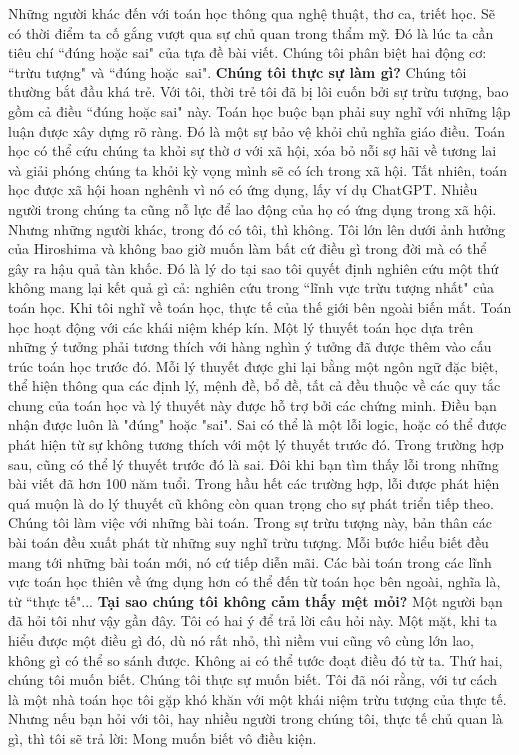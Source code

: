 \begin{multicols}{2}
	\vskip 0.1cm
	Những người khác đến với toán học thông qua nghệ thuật, thơ ca, triết học. Sẽ có thời điểm ta cố gắng vượt qua sự chủ quan trong thẩm mỹ. Đó là lúc ta cần tiêu chí ``đúng hoặc sai" của tựa đề bài viết. Chúng tôi phân biệt hai động cơ: ``trừu tượng" và ``đúng hoặc~sai".
	\vskip 0.1cm
	\textbf{\color{quantoan}Chúng tôi thực sự làm gì?}
	\vskip 0.1cm
	Chúng tôi thường bắt đầu khá trẻ. Với tôi, thời trẻ tôi đã bị lôi cuốn bởi sự trừu tượng, bao gồm cả điều ``đúng hoặc sai" này. Toán học buộc bạn phải suy nghĩ với những lập luận được xây dựng rõ ràng. Đó là một sự bảo vệ khỏi chủ nghĩa giáo điều. Toán học có thể cứu chúng ta khỏi sự thờ ơ với xã hội, xóa bỏ nỗi sợ hãi về tương lai và giải phóng chúng ta khỏi kỳ vọng mình sẽ có ích trong xã hội. Tất nhiên, toán học được xã hội hoan nghênh vì nó có ứng dụng, lấy ví dụ ChatGPT. 
	\vskip 0.1cm
	Nhiều người trong chúng ta cũng nỗ lực để lao động của họ có ứng dụng trong xã hội. Nhưng những người khác, trong đó có tôi, thì không. Tôi lớn lên dưới ảnh hưởng của Hiroshima và không bao giờ muốn làm bất cứ điều gì trong đời mà có thể gây ra hậu quả tàn khốc. Đó là lý do tại sao tôi quyết định nghiên cứu một thứ không mang lại kết quả gì cả: nghiên cứu trong ``lĩnh vực trừu tượng nhất" của toán học. Khi tôi nghĩ về toán học, thực tế của thế giới bên ngoài biến mất. Toán học hoạt động với các khái niệm khép kín. Một lý thuyết toán học dựa trên những ý tưởng phải tương thích với hàng nghìn ý tưởng đã được thêm vào cấu trúc toán học trước đó. Mỗi lý thuyết được ghi lại bằng một ngôn ngữ đặc biệt, thể hiện thông qua các định lý, mệnh đề, bổ đề, tất cả đều thuộc về các quy tắc chung của toán học và lý thuyết này được hỗ trợ bởi các chứng minh. 
	\vskip 0.1cm
	Điều bạn nhận được luôn là "đúng" hoặc "sai". Sai có thể là một lỗi logic, hoặc có thể được phát hiện từ sự không tương thích với một lý thuyết trước đó. Trong trường hợp sau, cũng có thể lý thuyết trước đó là sai. Đôi khi bạn tìm thấy lỗi trong những bài viết đã hơn 100 năm tuổi. Trong hầu hết các trường hợp, lỗi được phát hiện quá muộn là do lý thuyết cũ không còn quan trọng cho sự phát triển tiếp theo. Chúng tôi làm việc với những bài toán. Trong sự trừu tượng này, bản thân các bài toán đều xuất phát từ những suy nghĩ trừu tượng. Mỗi bước hiểu biết đều mang tới những bài toán mới, nó cứ tiếp diễn mãi. Các bài toán trong các lĩnh vực toán học thiên về ứng dụng hơn có thể đến từ toán học bên ngoài, nghĩa là, từ ``thực tế"...
	\vskip 0.1cm
	\textbf{\color{quantoan}Tại sao chúng tôi không cảm thấy mệt mỏi?}
	\vskip 0.1cm
	Một người bạn đã hỏi tôi như vậy gần đây. Tôi có hai ý để trả lời câu hỏi này. Một mặt, khi ta hiểu được một điều gì đó, dù nó rất nhỏ, thì niềm vui cũng vô cùng lớn lao, không gì có thể so sánh được. Không ai có thể tước đoạt điều đó từ ta. Thứ hai, chúng tôi muốn biết. Chúng tôi thực sự muốn biết. Tôi đã nói rằng, với tư cách là một nhà toán học tôi gặp khó khăn với một khái niệm trừu tượng của thực tế. Nhưng nếu bạn hỏi với tôi, hay nhiều người trong chúng tôi, thực tế chủ quan là gì, thì tôi sẽ trả lời: Mong muốn biết vô điều kiện. 
\end{multicols}

